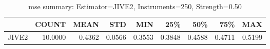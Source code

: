 \begin{table}[ht]
\centering
\caption{mse summary: Estimator=JIVE2, Instruments=250, Strength=0.50}
\begin{tabular}{lrrrrrrrr}
\toprule
 & COUNT & MEAN & STD & MIN & 25\% & 50\% & 75\% & MAX \\
\midrule
JIVE2 & 10.0000 & 0.4362 & 0.0566 & 0.3553 & 0.3848 & 0.4588 & 0.4711 & 0.5199 \\
\bottomrule
\end{tabular}
\end{table}
